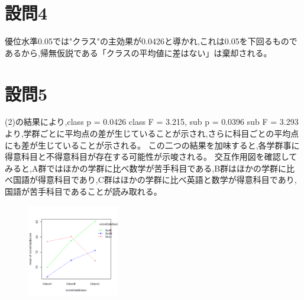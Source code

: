 \documentclass[fontsize = 10pt, paper= a4,twocolumn,column_gap=5zw]{jlreq}
\begin{document}
\section{設問4}
優位水準0.05では"クラス"の主効果が0.0426と導かれ,これは0.05を下回るものであるから,帰無仮説である「クラスの平均値に差はない」は棄却される。

\section{設問5}
(2)の結果により,class p = 0.0426 class F = 3.215, sub p = 0.0396 sub F = 3.293より,学群ごとに平均点の差が生じていることが示され,さらに科目ごとの平均点にも差が生じていることが示される。
この二つの結果を加味すると,各学群事に得意科目と不得意科目が存在する可能性が示唆される。
交互作用図を確認してみると,A群ではほかの学群に比べ数学が苦手科目である,B群はほかの学群に比べ国語が得意科目であり,C群はほかの学群に比べ英語と数学が得意科目であり,国語が苦手科目であることが読み取れる。
\begin{figure}
    \centering
    \includegraphics[width=4cm]{5-5.png}
\end{figure}
\end{document}
